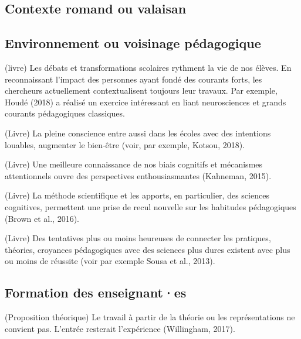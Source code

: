 \documentclass[
  french,
]{article}
\begin{document}
\hypertarget{contexte-romand-ou-valaisan}{%
\subsection{Contexte romand ou valaisan}\label{contexte-romand-ou-valaisan}}

\hypertarget{environnement-ou-voisinage-puxe9dagogique}{%
\subsection{Environnement ou voisinage pédagogique}\label{environnement-ou-voisinage-puxe9dagogique}}

(livre) Les débats et transformations scolaires rythment la vie de nos élèves. En reconnaissant l'impact des personnes ayant fondé des courants forts, les chercheurs actuellement contextualisent toujours leur travaux. Par exemple, Houdé (2018) a réalisé un exercice intéressant en liant neurosciences et grands courants pédagogiques classiques.

(Livre) La pleine conscience entre aussi dans les écoles avec des intentions louables, augmenter le bien-être (voir, par exemple, Kotsou, 2018).

(Livre) Une meilleure connaissance de nos biais cognitifs et mécanismes attentionnels ouvre des perspectives enthousiasmantes (Kahneman, 2015).

(Livre) La méthode scientifique et les apports, en particulier, des sciences cognitives, permettent une prise de recul nouvelle sur les habitudes pédagogiques (Brown et al., 2016).

(Livre) Des tentatives plus ou moins heureuses de connecter les pratiques, théories, croyances pédagogiques avec des sciences plus dures existent avec plus ou moins de réussite (voir par exemple Sousa et al., 2013).

\hypertarget{formation-des-enseignantes}{%
\subsection{Formation des enseignant·es}\label{formation-des-enseignantes}}

(Proposition théorique) Le travail à partir de la théorie ou les représentations ne convient pas. L'entrée resterait l'expérience (Willingham, 2017).
\end{document}
